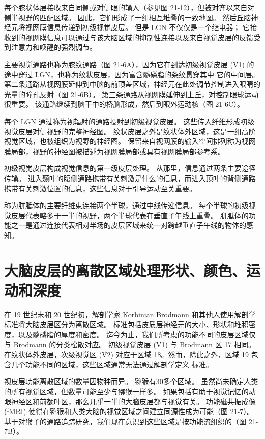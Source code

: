 每个膝状体层接收来自同侧或对侧眼的输入（参见图 21-12），但被对齐以来自对侧半视野的匹配区域。 因此，它们形成了一组相互堆叠的一致地图。 然后丘脑神经元将视网膜信息传递到初级视觉皮层。 但是 LGN 不仅仅是一个继电器； 它接收到的视网膜信息可以通过与该大脑区域的抑制性连接以及来自视觉皮层的反馈受到注意力和唤醒的强烈调节。

主要视觉通路也称为膝纹通路（图 21-6A），因为它在到达初级视觉皮层 (V1) 的途中穿过 LGN，也称为纹状皮层，因为富含髓磷脂的条纹贯穿其中 它的中间层。 第二条通路从视网膜延伸到中脑的前顶盖区域，神经元在此处调节控制进入眼睛的光量的瞳孔反射（图 21-6B）。 第三条通路从视网膜延伸到上丘，对控制眼球运动很重要。 该通路继续到脑干中的桥脑形成，然后到眼外运动核（图 21-6C）。

每个 LGN 通过称为视辐射的通路投射到初级视觉皮层。 这些传入纤维形成初级视觉皮层对侧视野的完整神经图。 纹状皮层之外是纹状体外区域，这是一组高阶视觉区域，也被组织为视野的神经图。 保留来自视网膜的输入空间排列称为视网膜局部，视野的神经图被描述为视网膜局部或具有视网膜局部参考系。

初级视觉皮层构成视觉信息的第一级皮层处理。 从那里，信息通过两条主要途径传输。 进入颞叶的腹侧通路携带有关刺激是什么的信息，而进入顶叶的背侧通路携带有关刺激位置的信息，这些信息对于引导运动至关重要。

称为胼胝体的主要纤维束连接两个半球，通过中线传递信息。 每个半球的初级视觉皮层代表略多于一半的视野，两个半球代表在垂直子午线上重叠。 胼胝体的功能之一是通过连接代表相对半场的皮层区域来统一对跨越垂直子午线的物体的感知。


\section{大脑皮层的离散区域处理形状、颜色、运动和深度}
在 19 世纪末和 20 世纪初，解剖学家 Korbinian Brodmann 和其他人使用解剖学标准将大脑皮层区分为离散区域。 标准包括皮质层神经元的大小、形状和堆积密度，以及髓磷脂的厚度和密度。 迄今为止，我们所考虑的功能不同的皮层区域仅与 Brodmann 的分类松散对应。 初级视觉皮层 (V1) 与 Brodmann 区 17 相同。在纹状体外皮层，次级视觉区 (V2) 对应于区域 18。然而，除此之外，区域 19 包含几个功能不同的区域，这些区域通常无法通过解剖学定义 标准。

视皮层功能离散区域的数量因物种而异。 猕猴有30多个区域。 虽然尚未确定人类的所有视觉区域，但数量可能至少与猕猴一样多。 如果包括有助于视觉记忆的动眼神经区和前额叶区，那么几乎一半的大脑皮层都与视觉有关。 功能磁共振成像 (fMRI) 使得在猕猴和人类大脑的视觉区域之间建立同源性成为可能（图 21-7）。 基于对猴子的通路追踪研究，我们现在意识到这些区域是按功能流组织的（图 21-7B）。

